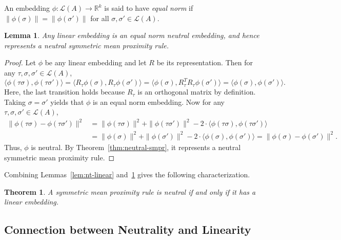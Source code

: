 \documentclass[10pt,letterpaper]{article}
\newcommand{\calL}{{\mathcal{L}}}
\newcommand{\rank}{{\calL(A)}}
\newtheorem{theorem}{Theorem}
\newtheorem{lemma}{Lemma}
\newenvironment{definition}[1][Definition]{\begin{trivlist}
\item[\hskip \labelsep {\bfseries #1}]}{\end{trivlist}}
\begin{document}
\begin{definition}[Equal Norm Embedding]
An embedding $\phi : \rank \rightarrow \mathbb{R}^k$ is said to have \emph{equal norm} if $\|\phi(\sigma)\| = \|\phi(\sigma')\|$ for all $\sigma,\sigma' \in \rank$.
\end{definition}

\begin{lemma}
Any linear embedding is an equal norm neutral embedding, and hence represents a neutral symmetric mean proximity rule.
\label{lem:linear-neutral}
\end{lemma}
\begin{proof}
Let $\phi$ be any linear embedding and let $R$ be its representation. Then for any $\tau,\sigma,\sigma' \in \rank$,
\begin{equation}
\langle \phi(\tau \sigma), \phi(\tau \sigma') \rangle = \langle R_{\tau}\phi(\sigma), R_{\tau}\phi(\sigma') \rangle = \langle \phi(\sigma), R_{\tau}^T R_{\tau}\phi(\sigma') \rangle = \langle \phi(\sigma), \phi(\sigma') \rangle.
\label{eqn:linear-inner-product}
\end{equation}
Here, the last transition holds because $R_{\tau}$ is an orthogonal matrix by definition. Taking $\sigma = \sigma'$ yields that $\phi$ is an equal norm embedding. Now for any $\tau,\sigma,\sigma' \in \rank$,
\begin{align*}
\|\phi(\tau \sigma)-\phi(\tau \sigma')\|^2 &= \|\phi(\tau \sigma)\|^2 + \|\phi(\tau \sigma')\|^2 - 2\cdot \langle \phi(\tau \sigma), \phi(\tau \sigma') \rangle \\
&= \|\phi(\sigma)\|^2 + \|\phi(\sigma')\|^2 - 2\cdot \langle \phi(\sigma), \phi(\sigma') \rangle = \|\phi(\sigma)-\phi(\sigma')\|^2.
\end{align*}
Thus, $\phi$ is neutral. By Theorem~\ref{thm:neutral-smpr}, it represents a neutral symmetric mean proximity rule.
\end{proof}

Combining Lemmas~\ref{lem:nt-linear} and~\ref{lem:linear-neutral} gives the following characterization.
\begin{theorem}
A symmetric mean proximity rule is neutral if and only if it has a linear embedding.
\label{thm:linear-char}
\end{theorem}

\subsection{Connection between Neutrality and Linearity}
\end{document}
